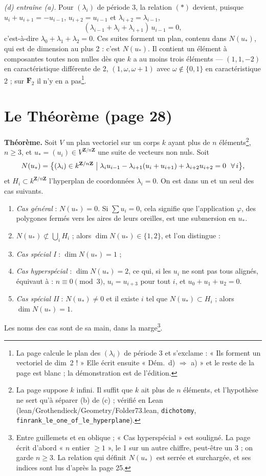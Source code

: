 \documentclass[11pt,a4paper]{article}
\begin{document}
\emph{(d) entraîne (a).} Pour $(\lambda_i)$ de période 3, la relation $(\ast)$
devient, puisque $u_i + u_{i+1} = -u_{i-1}$, $u_{i+2} = u_{i-1}$ et
$\lambda_{i+2} = \lambda_{i-1}$,
\[
  (\lambda_{i-1} + \lambda_i + \lambda_{i+1})\, u_{i-1} = 0 ,
\]
c'est-à-dire $\lambda_0 + \lambda_1 + \lambda_2 = 0$. Ces suites forment un
plan, contenu dans $N(u_*)$, qui est de dimension au plus 2 : c'est
$N(u_*)$. Il contient un élément à composantes toutes non nulles dès que $k$ a
au moins trois éléments --- $(1, 1, -2)$ en caractéristique différente de 2,
$(1, \omega, \omega + 1)$ avec $\omega \notin \{0, 1\}$ en caractéristique 2 ;
sur $\mathbf{F}_2$ il n'y en a pas\footnote{La page calcule le plan des
$(\lambda_i)$ de période 3 et s'exclame : « Ils forment un vectoriel de
dim~2 ! » Elle écrit ensuite « Dém.\ d) $\Rightarrow$ a) » et le reste de la
page est blanc ; la démonstration est de l'édition.}.

\section*{Le Théorème (page 28)}

\textbf{Théorème.} Soit $V$ un plan vectoriel sur un corps $k$ ayant plus de
$n$ éléments\footnote{La page suppose $k$ infini. Il suffit que $k$ ait plus de
$n$ éléments, et l'hypothèse ne sert qu'à séparer (b) de (c) ; vérifié en Lean
(lean/Grothendieck/Geometry/Folder73.lean, \texttt{dichotomy},
\texttt{finrank\_le\_one\_of\_le\_hyperplane}).},
$n \geqslant 3$, et $u_* = (u_i) \in V^{\mathbf{Z}/n\mathbf{Z}}$ une suite de
vecteurs non nuls. Soit
\[
  N(u_*) = \bigl\{ (\lambda_i) \in k^{\mathbf{Z}/n\mathbf{Z}} \bigm|
  \lambda_i u_{i-1} - \lambda_{i+1} (u_i + u_{i+1}) + \lambda_{i+2} u_{i+2} = 0
  \ \ \forall\, i \bigr\},
\]
et $H_i \subset k^{\mathbf{Z}/n\mathbf{Z}}$ l'hyperplan de coordonnées
$\lambda_i = 0$. On est dans un et un seul des cas suivants.
\begin{enumerate}
  \item[(a)] \emph{Cas général} : $N(u_*) = 0$. Si $\sum u_i = 0$, cela
    signifie que l'application $\varphi$, des polygones fermés vers les aires
    de leurs oreilles, est une submersion en $u_*$.
  \item[(b)] $N(u_*) \not\subset \bigcup_i H_i$ ; alors
    $\dim N(u_*) \in \{1, 2\}$, et l'on distingue :
  \item[(b$_1$)] \emph{Cas spécial I} : $\dim N(u_*) = 1$ ;
  \item[(b$_2$)] \emph{Cas hyperspécial} : $\dim N(u_*) = 2$, ce qui, si
    les $u_i$ ne sont pas tous alignés, équivaut à : $n \equiv 0
    \pmod 3$, $u_i = u_{i+3}$ pour tout $i$, et $u_0 + u_1 + u_2 = 0$.
  \item[(c)] \emph{Cas spécial II} : $N(u_*) \neq 0$ et il existe $i$ tel
    que $N(u_*) \subset H_i$ ; alors $\dim N(u_*) = 1$.
\end{enumerate}
Les noms des cas sont de sa main, dans la marge\footnote{Entre guillemets et
en oblique ; « Cas hyperspécial » est souligné. La page écrit d'abord
« $n$ entier $\geqslant 1$ », le 1 sur un autre chiffre, peut-être un 3 ; on
garde $n \geqslant 3$. La relation qui définit $N(u_*)$ est serrée et
surchargée, et ses indices sont lus d'après la page 25.}.
\end{document}
